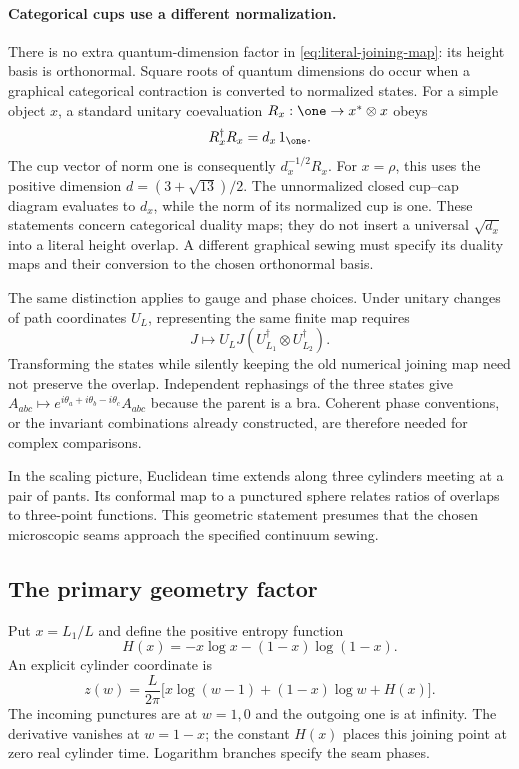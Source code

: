 \paragraph{Categorical cups use a different normalization.}
There is no extra quantum-dimension factor in
\eqref{eq:literal-joining-map}: its height basis is orthonormal.
Square roots of quantum dimensions do occur when a graphical
categorical contraction is converted to normalized states. For a
simple object $x$, a standard unitary coevaluation
$R_x:\one\to x^*\otimes x$ obeys
\[
 R_x^\dagger R_x=d_x\,1_{\one}.
\]
The cup vector of norm one is consequently $d_x^{-1/2}R_x$.
For $x=\rho$, this uses the positive dimension
$d=(3+\sqrt{13})/2$. The unnormalized closed cup--cap diagram
evaluates to $d_x$, while the norm of its normalized cup is one.
These statements concern categorical duality maps; they do not
insert a universal $\sqrt{d_x}$ into a literal height overlap.
A different graphical sewing must specify its duality maps and
their conversion to the chosen orthonormal basis.

The same distinction applies to gauge and phase choices. Under
unitary changes of path coordinates $U_L$, representing the same
finite map requires
\[
 J\longmapsto
 U_LJ(U_{L_1}^\dagger\otimes U_{L_2}^\dagger).
\]
Transforming the states while silently keeping the old numerical
joining map need not preserve the overlap. Independent rephasings
of the three states give
$A_{abc}\mapsto
e^{i\theta_a+i\theta_b-i\theta_c}A_{abc}$ because the parent is a
bra. Coherent phase conventions, or the invariant combinations
already constructed, are therefore needed for complex comparisons.

In the scaling picture, Euclidean time extends along three cylinders
meeting at a pair of pants. Its conformal map to a punctured sphere
relates ratios of overlaps to three-point functions. This geometric
statement presumes that the chosen microscopic seams approach the
specified continuum sewing.

\subsection{The primary geometry factor}

Put $x=L_1/L$ and define the positive entropy function
\[
 H(x)=-x\log x-(1-x)\log(1-x).
\]
An explicit cylinder coordinate is
\[
 z(w)=\frac L{2\pi}
 \bigl[x\log(w-1)+(1-x)\log w+H(x)\bigr].
\]
The incoming punctures are at $w=1,0$ and the outgoing one
is at infinity. The derivative vanishes at $w=1-x$; the
constant $H(x)$ places this joining point at zero real cylinder
time. Logarithm branches specify the seam phases.

